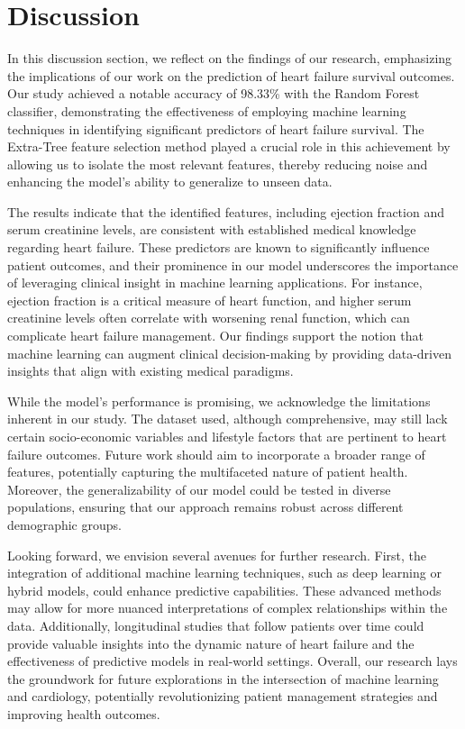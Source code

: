 \documentclass{article}
\begin{document}
\section{Discussion}
In this discussion section, we reflect on the findings of our research, emphasizing the implications of our work on the prediction of heart failure survival outcomes. Our study achieved a notable accuracy of 98.33\% with the Random Forest classifier, demonstrating the effectiveness of employing machine learning techniques in identifying significant predictors of heart failure survival. The Extra-Tree feature selection method played a crucial role in this achievement by allowing us to isolate the most relevant features, thereby reducing noise and enhancing the model's ability to generalize to unseen data.

The results indicate that the identified features, including ejection fraction and serum creatinine levels, are consistent with established medical knowledge regarding heart failure. These predictors are known to significantly influence patient outcomes, and their prominence in our model underscores the importance of leveraging clinical insight in machine learning applications. For instance, ejection fraction is a critical measure of heart function, and higher serum creatinine levels often correlate with worsening renal function, which can complicate heart failure management. Our findings support the notion that machine learning can augment clinical decision-making by providing data-driven insights that align with existing medical paradigms.

While the model's performance is promising, we acknowledge the limitations inherent in our study. The dataset used, although comprehensive, may still lack certain socio-economic variables and lifestyle factors that are pertinent to heart failure outcomes. Future work should aim to incorporate a broader range of features, potentially capturing the multifaceted nature of patient health. Moreover, the generalizability of our model could be tested in diverse populations, ensuring that our approach remains robust across different demographic groups.

Looking forward, we envision several avenues for further research. First, the integration of additional machine learning techniques, such as deep learning or hybrid models, could enhance predictive capabilities. These advanced methods may allow for more nuanced interpretations of complex relationships within the data. Additionally, longitudinal studies that follow patients over time could provide valuable insights into the dynamic nature of heart failure and the effectiveness of predictive models in real-world settings. Overall, our research lays the groundwork for future explorations in the intersection of machine learning and cardiology, potentially revolutionizing patient management strategies and improving health outcomes.
\end{document}
